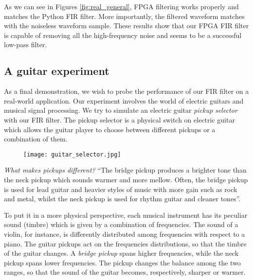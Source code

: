 %





As we can see in Figures \ref{fig:real_general}, FPGA filtering works properly and matches the Python FIR filter. More importantly, the filtered waveform matches with the noiseless waveform sample. These results show that our FPGA FIR filter is capable of removing all the high-frequency noise and seems to be a successful low-pass filter.


\subsection{A guitar experiment}
\label{ssec:demo_guitar}

As a final demonstration, we wish to probe the performance of our FIR filter on a real-world application. Our experiment involves the world of electric guitars and musical signal processing. We try to simulate an electric guitar \emph{pickup selector} with our FIR filter. The pickup selector is a physical switch on electric guitar which allows the guitar player to choose between different pickups or a combination of them.

\begin{figure}[H]
    \centering
    \texttt{[image: guitar\_selector.jpg]}
\end{figure}

\emph{What makes pickups different?} “The bridge pickup produces a brighter tone than the neck pickup which sounds warmer and more mellow. Often, the bridge pickup is used for lead guitar and heavier styles of music with more gain such as rock and metal, whilst the neck pickup is used for rhythm guitar and cleaner tones”\cite{pickup_guitar}.

To put it in a more physical perspective, each musical instrument has its peculiar sound (timbre) which is given by a combination of frequencies. The sound of a violin, for instance, is differently distributed among frequencies with respect to a piano. The guitar pickups act on the frequencies distributions, so that the timbre of the guitar changes. 
A \emph{bridge pickup} spans higher frequencies, while the neck pickup spans lower frequencies. The pickup changes the balance among the two ranges, so that the sound of the guitar becomes, respectively, sharper or warmer.

